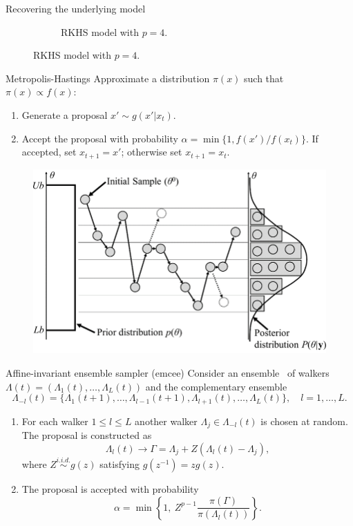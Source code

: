 \documentclass[9pt, english, professionalfonts]{beamer}
\newcommand\maroon[1]{\color{mLightBrown}#1\color{mDarkTeal}}
\begin{document}
\begin{frame}{Recovering the underlying model}
\begin{figure}[b]
\begin{subfigure}[b]{0.48\textwidth}
    \caption{RKHS model with \(p=4\).}
  \end{subfigure}
\end{figure}
\end{frame}

\begin{frame}{Metropolis-Hastings}
  Approximate a distribution \(\pi(x)\) such that \(\pi(x)\propto f(x)\):
  \begin{enumerate}
  \item Generate a proposal \(x' \sim g(x'|x_t)\).
  \item Accept the proposal with probability \(\alpha=\min\{1, f(x')/f(x_t)\}\). If accepted, set \(x_{t+1}=x'\); otherwise set \(x_{t+1}=x_t\).
\end{enumerate}

\vspace{1em}

 \begin{figure}
   \centering
   \includegraphics[width=.6\textwidth]{mh}
 \end{figure}
\end{frame}

\begin{frame}{Affine-invariant ensemble sampler (emcee)}
Consider an \maroon{ensemble} \ of walkers \(\Lambda(t) = (\Lambda_1(t), \dots, \Lambda_L(t))\) and the complementary ensemble
\[
  \Lambda_{-l}(t) = \{\Lambda_1(t+1), \dots, \Lambda_{l-1}(t+1), \Lambda_{l+1}(t), \dots, \Lambda_L(t)\}, \quad l=1,\dots, L.
\]
\vspace{-1em}
\begin{enumerate}
  \item For each walker \(1\leq l \leq L\) another walker \(\Lambda_j \in \Lambda_{-l}(t)\) is chosen at random. The proposal is constructed as
  \[
    \Lambda_l(t) \to \Gamma = \Lambda_j + Z(\Lambda_l(t) - \Lambda_j),
\]
where \(Z \stackrel{i.i.d.}{\sim} g(z)\) satisfying \(g(z^{-1})=zg(z)\).
\item  The proposal is accepted with probability
  \[
    \alpha = \min\left\{1, \ Z^{p-1}\frac{\pi(\Gamma)}{\pi(\Lambda_l(t))}\right\}.
  \]
\end{enumerate}
\end{frame}
\end{document}
